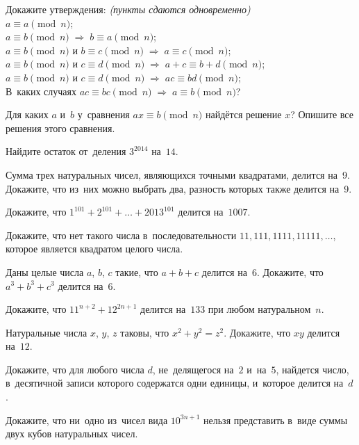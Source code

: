 \begin{problems}

\item
Докажите утверждения: \emph{(пункты сдаются одновременно)}
\\
\sp $a \equiv a \pmod n$; %
\\
\sp
\(
    a \equiv b \pmod n
\;\Rightarrow\;
    b \equiv a \pmod n
\);
\\
\sp
\(
    a \equiv b \pmod n \text{ и } b \equiv c \pmod n
\;\Rightarrow\;
    a \equiv c \pmod n
\);
\\
\sp
\(
    a \equiv b \pmod n \text{ и } c \equiv d \pmod n
\;\Rightarrow\;
    a + c \equiv b + d \pmod n
\);
\\
\sp
\(
    a \equiv b \pmod n \text{ и } c \equiv d \pmod n
\;\Rightarrow\;
    a c \equiv b d \pmod n
\);
\\
\sp%
В~каких случаях
\(
    a c \equiv b c \pmod n
\;\Rightarrow\;
    a\equiv b \pmod n
\)?

\item
Для каких $a$ и~$b$ у~сравнения $ax \equiv b \pmod n$ найдётся решение $x$?
Опишите все решения этого сравнения.

\item
Найдите остаток от~деления $3^{2014}$ на~$14$.

\item
Сумма трех натуральных чисел, являющихся точными квадратами, делится на~9.
Докажите, что из~них можно выбрать два, разность которых также делится на~9.

\item
Докажите, что $1^{101} + 2^{101} + \dots + 2013^{101}$ делится на~$1007$.

\item
Докажите, что нет такого числа в~последовательности
$11, 111, 1111, 11111, \ldots$,
которое является квадратом целого числа. 

\item
Даны целые числа $a$, $b$, $c$ такие, что $a + b + c$ делится на~$6$.
Докажите, что $a^3 + b^3 + c^3$ делится на~$6$.

\item
Докажите, что $11^{n+2} + 12^{2n + 1}$ делится на~$133$ при любом
натуральном~$n$.

\item
Натуральные числа $x$, $y$, $z$ таковы, что $x^2 + y^2 = z^2$.
Докажите, что $xy$ делится на~$12$.

\item
Докажите, что для любого числа $d$, не~делящегося на~$2$ и~на~$5$, найдется
число, в~десятичной записи которого содержатся одни единицы, и~которое
делится на~$d$.

\item
Докажите, что ни~одно из~чисел вида $10^{3n+1}$ нельзя представить в~виде суммы
двух кубов натуральных чисел.

\end{problems}

